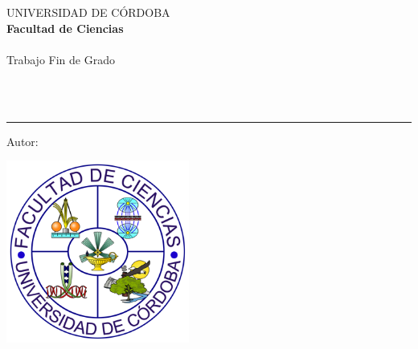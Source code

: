 
\AddToShipoutPicture*{\BackgroundPic}
\begin{titlepage}
\begin{center}
\Large UNIVERSIDAD DE CÓRDOBA\\[0.5 cm]
\large  \textbf{Facultad de Ciencias}\\[1.25 cm]
\large \textbf{\titulacion}\\[1.25 cm]
\Large  Trabajo Fin de Grado\\[2.25 cm]
\Huge   \titulo
\end{center}
\vspace{1.25cm}
\\[0.3cm]
\\[0.5cm]
{\color{blue}\hrule}
\vspace{0.5cm}
\noindent \Large{Autor: \autor}
\vfill
\begin{center}
 \includegraphics[width=6cm]{logo_ciencias.png} 
\end{center}
\vfill
\rightline{\fecha}
\end{titlepage}
\renewcommand{\baselinestretch}{0.9}
\ClearShipoutPicture





